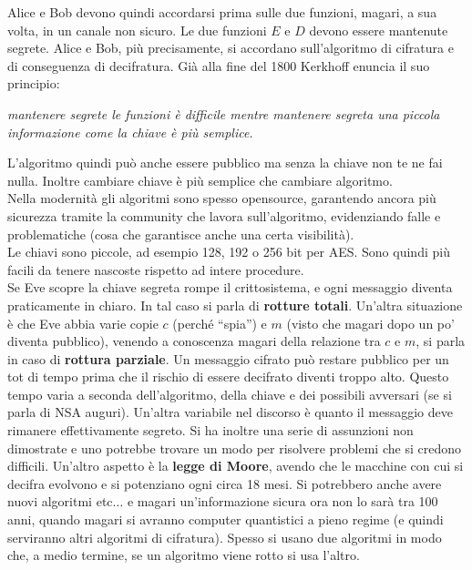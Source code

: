\documentclass[a4paper,12pt, oneside]{book}
\begin{document}
Alice e Bob devono quindi accordarsi prima sulle due funzioni, magari, a sua
volta, in un canale non sicuro. Le due funzioni $E$ e $D$ devono essere
mantenute segrete. Alice e Bob, più precisamente, si accordano sull'algoritmo di
cifratura e di conseguenza di decifratura. Già alla fine del 1800 Kerkhoff
enuncia il suo principio:
\begin{center}
  \textit{mantenere segrete le funzioni è difficile mentre mantenere segreta una
  piccola informazione come la chiave è più semplice.}
\end{center}
L'algoritmo quindi può anche essere pubblico ma senza la chiave non te ne fai
nulla. Inoltre cambiare chiave è più semplice che cambiare algoritmo.\\
Nella modernità gli algoritmi sono spesso opensource, garantendo ancora più
sicurezza tramite la community che lavora sull'algoritmo, evidenziando falle e
problematiche (cosa che garantisce anche una certa visibilità).\\
Le chiavi sono piccole, ad esempio 128, 192 o 256 bit per AES. Sono quindi più
facili da tenere nascoste rispetto ad intere procedure.\\
Se Eve scopre la chiave segreta rompe il crittosistema, e ogni messaggio diventa
praticamente in chiaro. In tal caso si parla di \textbf{rotture
  totali}. Un'altra situazione è che Eve abbia varie copie $c$ (perché ``spia'')
e $m$ (visto che magari dopo un po' diventa pubblico), venendo a conoscenza
magari della relazione tra $c$ e $m$, si parla in caso di \textbf{rottura
  parziale}. Un messaggio cifrato può restare pubblico per un tot di tempo prima
che il rischio di essere decifrato diventi troppo alto. Questo tempo varia a
seconda dell'algoritmo, della chiave e dei possibili avversari (se si parla di
NSA auguri). Un'altra variabile nel discorso è quanto il messaggio deve rimanere
effettivamente segreto. Si ha inoltre una serie di assunzioni non dimostrate e
uno potrebbe trovare un modo per risolvere problemi che si credono
difficili. Un'altro aspetto è la \textbf{legge di Moore}, avendo che le macchine
con cui si decifra evolvono e si potenziano ogni circa 18 mesi. Si potrebbero
anche avere nuovi algoritmi etc$\ldots$ e magari un'informazione sicura ora non
lo sarà tra 100 anni, quando magari si avranno computer quantistici a pieno
regime (e quindi serviranno altri algoritmi di cifratura). Spesso si usano due
algoritmi in modo che, a medio termine, se un algoritmo viene rotto si usa
l'altro. 
\end{document}
